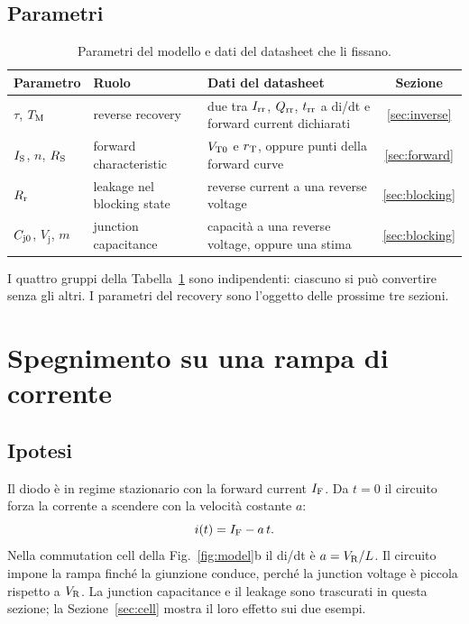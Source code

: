 \documentclass[10pt,a4paper]{scrartcl}
\let\newcommand\lmitdefine
\newcommand{\IF}{I_\mathrm{F}}
\newcommand{\VR}{V_\mathrm{R}}
\newcommand{\Irr}{I_\mathrm{rr}}
\newcommand{\Qrr}{Q_\mathrm{rr}}
\newcommand{\trr}{t_\mathrm{rr}}
\newcommand{\TM}{T_\mathrm{M}}
\newcommand{\IS}{I_\mathrm{S}}
\newcommand{\RS}{R_\mathrm{S}}
\newcommand{\Rr}{R_\mathrm{r}}
\newcommand{\VTo}{V_\mathrm{T0}}
\newcommand{\rT}{r_\mathrm{T}}
\newcommand{\Cjo}{C_\mathrm{j0}}
\begin{document}
\subsection{Parametri}
\begin{table}[htb]
\centering\small
\caption{Parametri del modello e dati del datasheet che li fissano.}
\label{tab:params}
\begin{tabular}{@{}llp{6.4cm}c@{}}
\toprule
Parametro & Ruolo & Dati del datasheet & Sezione \\
\midrule
$\tau$, $\TM$ & reverse recovery & due tra $\Irr$, $\Qrr$, $\trr$ a di/dt e forward current dichiarati & \ref{sec:inverse} \\
$\IS$, $n$, $\RS$ & forward characteristic & $\VTo$ e $\rT$, oppure punti della forward curve & \ref{sec:forward} \\
$\Rr$ & leakage nel blocking state & reverse current a una reverse voltage & \ref{sec:blocking} \\
$\Cjo$, $V_\mathrm{j}$, $m$ & junction capacitance & capacità a una reverse voltage, oppure una stima & \ref{sec:blocking} \\
\bottomrule
\end{tabular}
\end{table}
I quattro gruppi della Tabella~\ref{tab:params} sono indipendenti: ciascuno si può convertire senza gli altri. I parametri del recovery sono l'oggetto delle prossime tre sezioni.

\section{Spegnimento su una rampa di corrente}
\label{sec:ramp}
\subsection{Ipotesi}
Il diodo è in regime stazionario con la forward current $\IF$. Da $t = 0$ il circuito forza la corrente a scendere con la velocità costante $a$:
\begin{equation}
i(t) = \IF - a\,t .
\label{eq:ramp}
\end{equation}
Nella commutation cell della Fig.~\ref{fig:model}b il di/dt è $a = \VR/L$. Il circuito impone la rampa finché la giunzione conduce, perché la junction voltage è piccola rispetto a $\VR$. La junction capacitance e il leakage sono trascurati in questa sezione; la Sezione~\ref{sec:cell} mostra il loro effetto sui due esempi.
\end{document}
